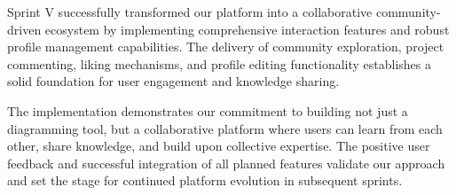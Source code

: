 Sprint V successfully transformed our platform into a collaborative community-driven ecosystem by implementing comprehensive interaction features and robust profile management capabilities. The delivery of community exploration, project commenting, liking mechanisms, and profile editing functionality establishes a solid foundation for user engagement and knowledge sharing.

The implementation demonstrates our commitment to building not just a diagramming tool, but a collaborative platform where users can learn from each other, share knowledge, and build upon collective expertise. The positive user feedback and successful integration of all planned features validate our approach and set the stage for continued platform evolution in subsequent sprints.